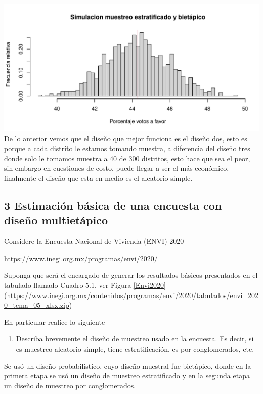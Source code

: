 \documentclass[
]{article}
\providecommand{\tightlist}{%
  \setlength{\itemsep}{0pt}\setlength{\parskip}{0pt}}
\begin{document}
\includegraphics{ex-03_files/figure-latex/unnamed-chunk-10-3.pdf} De lo
anterior vemos que el diseño que mejor funciona es el diseño dos, esto
es porque a cada distrito le estamos tomando muestra, a diferencia del
diseño tres donde solo le tomamos muestra a 40 de 300 distritos, esto
hace que sea el peor, sin embargo en cuestiones de costo, puede llegar a
ser el más económico, finalmente el diseño que esta en medio es el
aleatorio simple.

\hypertarget{estimaciuxf3n-buxe1sica-de-una-encuesta-con-diseuxf1o-multietuxe1pico}{%
\subsection{3 Estimación básica de una encuesta con diseño
multietápico}\label{estimaciuxf3n-buxe1sica-de-una-encuesta-con-diseuxf1o-multietuxe1pico}}

Considere la Encuesta Nacional de Vivienda (ENVI) 2020

\url{https://www.inegi.org.mx/programas/envi/2020/}

Suponga que será el encargado de generar los resultados básicos
presentados en el tabulado llamado Cuadro 5.1, ver Figura \ref{Envi2020}
(\url{https://www.inegi.org.mx/contenidos/programas/envi/2020/tabulados/envi_2020_tema_05_xlsx.zip})

En particular realice lo siguiente

\begin{enumerate}
\def\labelenumi{\roman{enumi}.}
\tightlist
\item
  Describa brevemente el diseño de muestreo usado en la encuesta. Es
  decir, si es muestreo aleatorio simple, tiene estratificación, es por
  conglomerados, etc.
\end{enumerate}

Se usó un diseño probabilístico, cuyo diseño muestral fue bietápico,
donde en la primera etapa se usó un diseño de muestreo estratificado y
en la segunda etapa un diseño de muestreo por conglomerados.
\end{document}
